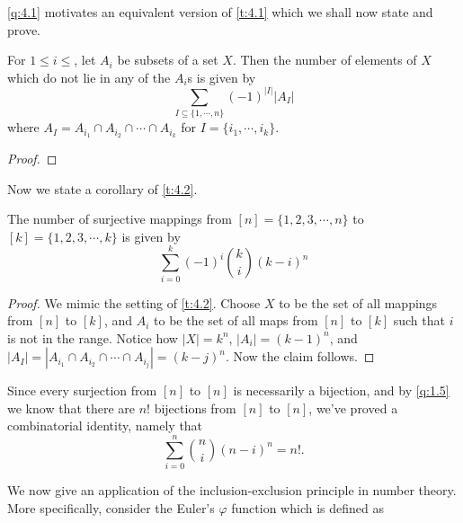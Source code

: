 \cref{q:4.1} motivates an equivalent version of \cref{t:4.1} which we shall now state and prove.
\begin{theorem}
For $1\leq i\leq$, let $A_i$ be subsets of a set $X$. Then the number of elements of $X$ which do not lie in any of the $A_i$s is given by
\[
\sum_{I\subseteq \{1,\cdots,n\}}(-1)^{|I|}|A_I|
\] where $A_I = A_{i_1}\cap A_{i_2}\cap \cdots \cap A_{i_k}$ for $I=\{i_1,\cdots,i_k\}$. 
\label{t:4.2}
\end{theorem}
\begin{proof}
\end{proof}

Now we state a corollary of \cref{t:4.2}.
\begin{claim}
The number of surjective mappings from $[n]=\{1,2,3,\cdots,n\}$ to $[k]=\{1,2,3,\cdots,k\}$ is given by \[
    \sum_{i=0}^{k}(-1)^i\binom{k}{i}(k-i)^n
    \]
\end{claim}
\begin{proof}
We mimic the setting of \cref{t:4.2}. Choose $X$ to be the set of all mappings from $[n]$ to $[k]$, and $A_i$ to be the set of all maps from $[n]$ to $[k]$ such that $i$ is not in the range. Notice how $|X|=k^n$, $|A_i|=(k-1)^n$, and $|A_I| = |A_{i_1}\cap A_{i_2}\cap \cdots \cap A_{i_j}|=(k-j)^n$. Now the claim follows. 
\end{proof}

\begin{remark}
Since every surjection from $[n]$ to $[n]$ is necessarily a bijection, and by \cref{q:1.5} we know that there are $n!$ bijections from $[n]$ to $[n]$, we've proved a combinatorial identity, namely that
\[
\sum_{i=0}^{n}\binom{n}{i}(n-i)^n=n!.
\]
\end{remark}
We now give an application of the inclusion-exclusion principle in number theory. More specifically, consider the Euler's $\varphi$ function which is defined as
